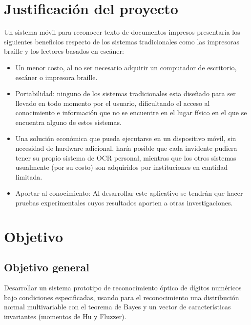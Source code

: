 \documentclass[a4paper, 11pt, oneside]{report}
\begin{document}
\section{Justificación del proyecto}

Un sistema móvil para reconocer texto de documentos impresos presentaría los siguientes beneficios respecto de los sistemas tradicionales como las impresoras braille y los lectores basados en escáner:

	\begin{itemize} 

	\item Un menor costo, al no ser necesario adquirir un computador de escritorio, escáner o impresora braille.

	\item Portabilidad: ninguno de los sistemas tradicionales esta diseñado para ser llevado en todo momento por el usuario, dificultando el acceso al conocimiento e información que no se encuentre en el lugar físico en el que se encuentra alguno de estos sistemas.
	
	\item Una solución económica que pueda ejecutarse en un dispositivo móvil, sin necesidad de hardware adicional, haría posible que cada invidente pudiera tener su propio sistema de OCR personal, mientras que los otros sistemas usualmente (por su costo) son adquiridos por instituciones en cantidad limitada.

	\item Aportar al conocimiento: Al desarrollar este aplicativo se tendrán que hacer pruebas experimentales cuyos resultados aporten a otras investigaciones.

	\end{itemize}
	
\section{Objetivo}
\label{sect:objective}
	
	\subsection{Objetivo general}
	Desarrollar un sistema prototipo de reconocimiento óptico de dígitos numéricos bajo condiciones especificadas, usando para el reconocimiento una distribución normal multivariable con el teorema de Bayes y un vector de características invariantes (momentos de Hu y Fluzzer).
\end{document}
